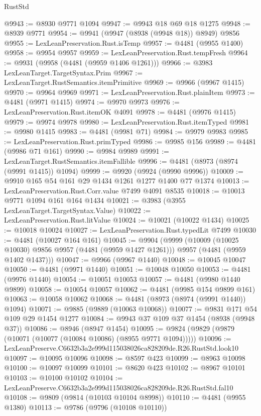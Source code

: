 \begin{lexlean}{RustStd}
\begin{coremodule}
@9943 := @8930 @9771 @1094
@9947 := @9943 @18 @69 @18 @1275
@9948 := @8939 @9771
@9954 := @9941 (@9947 (@8938 (@9948 @18)) @8949) @9856
@9955 := LexLeanPreservation.Rust.isTemp
@9957 := @4481 (@9955 @1400)
@9958 := @9954 @9957
@9959 := LexLeanPreservation.Rust.tempFresh
@9964 := @9931 (@9958 (@4481 (@9959 @1406 @1261)))
@9966 := @3983 LexLeanTarget.TargetSyntax.Prim
@9967 := LexLeanTarget.RustSemantics.itemPrimitive
@9969 := @9966 (@9967 @1415)
@9970 := @9964 @9969
@9971 := LexLeanPreservation.Rust.plainItem
@9973 := @4481 (@9971 @1415)
@9974 := @9970 @9973
@9976 := LexLeanPreservation.Rust.itemOK @4091
@9978 := @4481 (@9976 @1415)
@9979 := @9974 @9978
@9980 := LexLeanPreservation.Rust.itemTyped
@9981 := @9980 @1415
@9983 := @4481 (@9981 @71)
@9984 := @9979 @9983
@9985 := LexLeanPreservation.Rust.primTyped
@9986 := @9985 @156
@9989 := @4481 (@9986 @71 @161)
@9990 := @9984 @9989
@9991 := LexLeanTarget.RustSemantics.itemFallible
@9996 := @4481 (@8973 (@8974 (@9991 @1415)) @1094)
@9999 := @9920 (@9924 (@9990 @9996))
@10009 := @9910 @165 @54 @161 @29 @1434 @1261 @1277 @1400 @77 @1374
@10013 := LexLeanPreservation.Rust.Corr.value @7499 @4091 @8535
@10018 := @10013 @9771 @1094 @161 @164 @1434
@10021 := @3983 (@3955 LexLeanTarget.TargetSyntax.Value)
@10022 := LexLeanPreservation.Rust.litValue
@10024 := @10021 (@10022 @1434)
@10025 := @10018 @10024
@10027 := LexLeanPreservation.Rust.typedLit @7499
@10030 := @4481 (@10027 @164 @161)
@10045 := @9904
    (@9999
      (@10009 (@10025 @10030) @9856 @9957 (@4481 (@9959 @1427 @1261)))
      @9957
      (@4481 (@9959 @1402 @1437)))
@10047 := @9966 (@9967 @1440)
@10048 := @10045 @10047
@10050 := @4481 (@9971 @1440)
@10051 := @10048 @10050
@10053 := @4481 (@9976 @1440)
@10054 := @10051 @10053
@10057 := @4481 (@9980 @1440 @9899)
@10058 := @10054 @10057
@10062 := @4481 (@9985 @154 @9899 @161)
@10063 := @10058 @10062
@10068 := @4481 (@8973 (@8974 (@9991 @1440)) @1094)
@10071 := @9885 (@9889 (@10063 @10068))
@10077 := @9831 @171 @54 @109 @29 @1454 @1277
@10084 := @9943 @37 @109 @37 @1454 (@8938 (@9948 @37))
@10086 := @8946 (@8947 @1454)
@10095 := @9824 (@9829 (@9879 (@10071 (@10077 (@10084 @10086) (@8955 @9771 @1094)))))
@10096 := LexLeanPreserve.C6632b3a2e999d115038026ca828209de.R26.RustStd.look10
@10097 := @10095 @10096
@10098 := @8597 @423
@10099 := @8963 @10098
@10100 := @10097 @10099
@10101 := @8620 @423
@10102 := @8967 @10101
@10103 := @10100 @10102
@10104 := LexLeanPreserve.C6632b3a2e999d115038026ca828209de.R26.RustStd.fal10
@10108 := @9809 (@9814 (@10103 @10104 @8998))
@10110 := @4481 (@9955 @1380)
@10113 := @9786 (@9796 (@10108 @10110))

\end{coremodule}
\end{lexlean}
